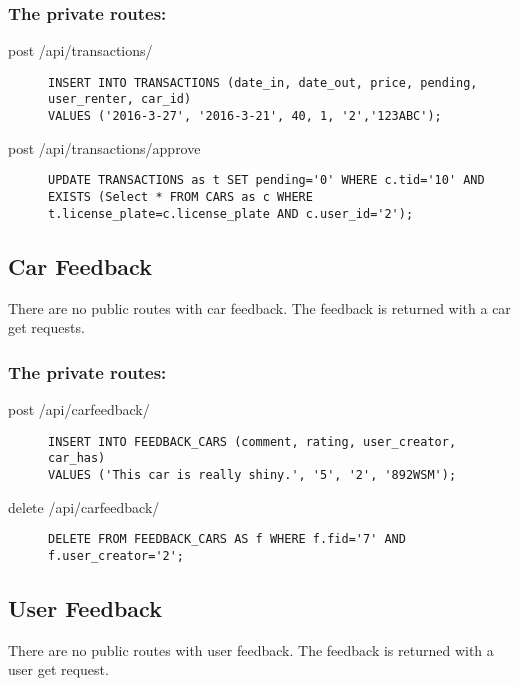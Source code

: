 \documentclass{article}
\begin{document}
\subsubsection{The private routes:}
\begin{description}
\item[post /api/transactions/] \mbox{}
\begin{lstlisting}[style=sql]
INSERT INTO TRANSACTIONS (date_in, date_out, price, pending, user_renter, car_id)
VALUES ('2016-3-27', '2016-3-21', 40, 1, '2','123ABC');
\end{lstlisting}
\item[post /api/transactions/approve] \mbox{}
\begin{lstlisting}[style=sql]
UPDATE TRANSACTIONS as t SET pending='0' WHERE c.tid='10' AND EXISTS (Select * FROM CARS as c WHERE t.license_plate=c.license_plate AND c.user_id='2');
\end{lstlisting}
\end{description}

\subsection{Car Feedback}
There are no public routes with car feedback. The feedback is returned with a car get requests.

\subsubsection{The private routes:}
\begin{description}
\item[post /api/carfeedback/] \mbox{}
\begin{lstlisting}[style=sql]
INSERT INTO FEEDBACK_CARS (comment, rating, user_creator, car_has)
VALUES ('This car is really shiny.', '5', '2', '892WSM');
\end{lstlisting}
\item[delete /api/carfeedback/] \mbox{}
\begin{lstlisting}[style=sql]
DELETE FROM FEEDBACK_CARS AS f WHERE f.fid='7' AND f.user_creator='2';
\end{lstlisting}
\end{description}

\subsection{User Feedback}
There are no public routes with user feedback. The feedback is returned with a user get request.
\end{document}
